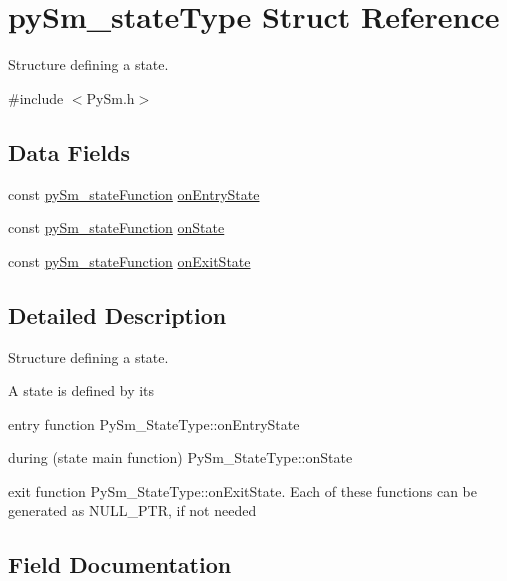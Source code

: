 \hypertarget{structpySm__stateType}{}\section{py\+Sm\+\_\+state\+Type Struct Reference}
\label{structpySm__stateType}


Structure defining a state.  




{\ttfamily \#include $<$Py\+Sm.\+h$>$}

\subsection*{Data Fields}
\begin{DoxyCompactItemize}
\item 
const \hyperlink{PySm_8h_a4f768845ccbe1d4a74cabced29df0c9f}{py\+Sm\+\_\+state\+Function} \hyperlink{structpySm__stateType_acd3c4f8cca7d7792fee332c61419553f}{on\+Entry\+State}
\item 
const \hyperlink{PySm_8h_a4f768845ccbe1d4a74cabced29df0c9f}{py\+Sm\+\_\+state\+Function} \hyperlink{structpySm__stateType_a189eccdfa6bcafd4964b27834edb38c8}{on\+State}
\item 
const \hyperlink{PySm_8h_a4f768845ccbe1d4a74cabced29df0c9f}{py\+Sm\+\_\+state\+Function} \hyperlink{structpySm__stateType_aba503ee3ae11c3303088c94fa30d30d0}{on\+Exit\+State}
\end{DoxyCompactItemize}


\subsection{Detailed Description}
Structure defining a state. 

A state is defined by it\textquotesingle{}s
\begin{DoxyItemize}
\item entry function Py\+Sm\+\_\+\+State\+Type\+::on\+Entry\+State
\item during (state main function) Py\+Sm\+\_\+\+State\+Type\+::on\+State
\item exit function Py\+Sm\+\_\+\+State\+Type\+::on\+Exit\+State. Each of these functions can be generated as N\+U\+L\+L\+\_\+\+P\+TR, if not needed 
\end{DoxyItemize}

\subsection{Field Documentation}
\mbox{\label{structpySm__stateType_acd3c4f8cca7d7792fee332c61419553f}} 
